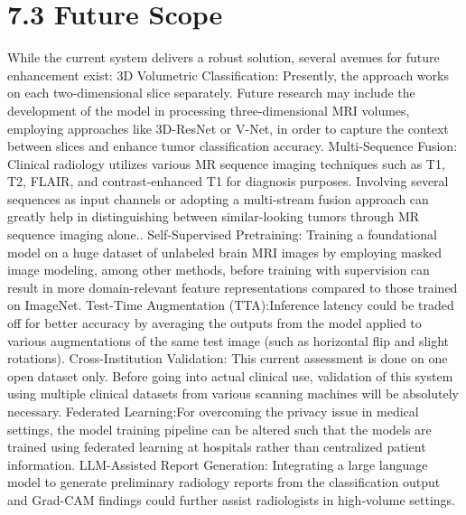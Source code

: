 \documentclass[12pt,a4paper,oneside]{report}
\begin{document}
\section*{7.3 Future Scope}
While the current system delivers a robust solution, several avenues for future enhancement exist:
3D Volumetric Classification: Presently, the approach works on each two-dimensional slice separately. Future research may include the development of the model in processing three-dimensional MRI volumes, employing approaches like 3D-ResNet or V-Net, in order to capture the context between slices and enhance tumor classification accuracy.
Multi-Sequence Fusion: Clinical radiology utilizes various MR sequence imaging techniques such as T1, T2, FLAIR, and contrast-enhanced T1 for diagnosis purposes. Involving several sequences as input channels or adopting a multi-stream fusion approach can greatly help in distinguishing between similar-looking tumors through MR sequence imaging alone..
Self-Supervised Pretraining: Training a foundational model on a huge dataset of unlabeled brain MRI images by employing masked image modeling, among other methods, before training with supervision can result in more domain-relevant feature representations compared to those trained on ImageNet.
Test-Time Augmentation (TTA):Inference latency could be traded off for better accuracy by averaging the outputs from the model applied to various augmentations of the same test image (such as horizontal flip and slight rotations).
Cross-Institution Validation: This current assessment is done on one open dataset only. Before going into actual clinical use, validation of this system using multiple clinical datasets from various scanning machines will be absolutely necessary.
Federated Learning:For overcoming the privacy issue in medical settings, the model training pipeline can be altered such that the models are trained using federated learning at hospitals rather than centralized patient information.
LLM-Assisted Report Generation: Integrating a large language model to generate preliminary radiology reports from the classification output and Grad-CAM findings could further assist radiologists in high-volume settings.
\end{document}
